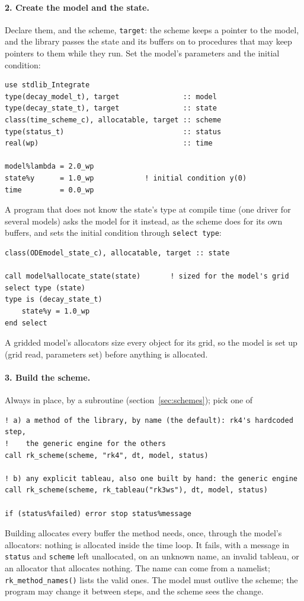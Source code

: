 \documentclass[11pt,a4paper]{article}
\newcommand{\code}[1]{\texttt{#1}}
\begin{document}
\paragraph{2. Create the model and the state.} Declare them, and the scheme,
\code{target}: the scheme keeps a pointer to the model, and the library passes
the state and its buffers on to procedures that may keep pointers to them
while they run. Set the model's parameters and the
initial condition:
\begin{lstlisting}
use stdlib_Integrate
type(decay_model_t), target               :: model
type(decay_state_t), target               :: state
class(time_scheme_c), allocatable, target :: scheme
type(status_t)                            :: status
real(wp)                                  :: time

model%lambda = 2.0_wp
state%y      = 1.0_wp            ! initial condition y(0)
time         = 0.0_wp
\end{lstlisting}
A program that does not know the state's type at compile time (one driver for
several models) asks the model for it instead, as the scheme does for its own
buffers, and sets the initial condition through \code{select type}:
\begin{lstlisting}
class(ODEmodel_state_c), allocatable, target :: state

call model%allocate_state(state)       ! sized for the model's grid
select type (state)
type is (decay_state_t)
    state%y = 1.0_wp
end select
\end{lstlisting}
A gridded model's allocators size every object for its grid, so the model is
set up (grid read, parameters set) before anything is allocated.

\paragraph{3. Build the scheme.} Always in place, by a subroutine
(section~\ref{sec:schemes}); pick one of
\begin{lstlisting}
! a) a method of the library, by name (the default): rk4's hardcoded step,
!    the generic engine for the others
call rk_scheme(scheme, "rk4", dt, model, status)

! b) any explicit tableau, also one built by hand: the generic engine
call rk_scheme(scheme, rk_tableau("rk3ws"), dt, model, status)

if (status%failed) error stop status%message
\end{lstlisting}
Building allocates every buffer the method needs, once, through the model's
allocators: nothing is allocated inside the time loop. It fails, with a
message in \code{status} and \code{scheme} left unallocated, on an unknown
name, an invalid tableau, or an allocator that allocates nothing. The name can come from a
namelist; \code{rk\_method\_names()} lists the valid ones. The model must
outlive the scheme; the program may change it between steps, and the
scheme sees the change.
\end{document}
